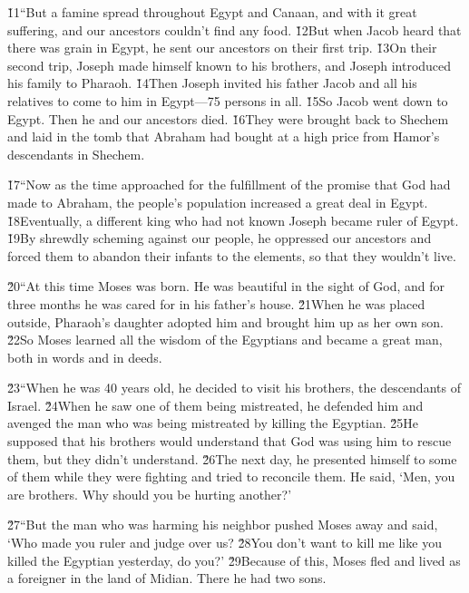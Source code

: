 \v{11}``But a famine spread throughout Egypt and Canaan, and with it great suffering, and our ancestors couldn't find any food. \v{12}But when Jacob heard that there was grain in Egypt, he sent our ancestors on their first trip. \v{13}On their second trip, Joseph made himself known to his brothers, and Joseph introduced his family to Pharaoh. \v{14}Then Joseph invited his father Jacob and all his relatives to come to him in Egypt---75 persons in all. \v{15}So Jacob went down to Egypt. Then he and our ancestors died. \v{16}They were brought back to Shechem and laid in the tomb that Abraham had bought at a high price from Hamor's descendants in Shechem.

\v{17}``Now as the time approached for the fulfillment of the promise that God had made to Abraham, the people's population increased a great deal in Egypt. \v{18}Eventually, a different king who had not known Joseph became ruler of Egypt. \v{19}By shrewdly scheming against our people, he oppressed our ancestors and forced them to abandon their infants to the elements, so that they wouldn't live.

\v{20}``At this time Moses was born. He was beautiful in the sight of God, and for three months he was cared for in his father's house. \v{21}When he was placed outside, Pharaoh's daughter adopted him and brought him up as her own son. \v{22}So Moses learned all the wisdom of the Egyptians and became a great man, both in words and in deeds.

\v{23}``When he was 40 years old, he decided to visit his brothers, the descendants of Israel. \v{24}When he saw one of them being mistreated, he defended him and avenged the man who was being mistreated by killing the Egyptian. \v{25}He supposed that his brothers would understand that God was using him to rescue them, but they didn't understand. \v{26}The next day, he presented himself to some of them while they were fighting and tried to reconcile them. He said, `Men, you are brothers. Why should you be hurting another?'

\v{27}``But the man who was harming his neighbor pushed Moses away and said, `Who made you ruler and judge over us? \v{28}You don't want to kill me like you killed the Egyptian yesterday, do you?' \v{29}Because of this, Moses fled and lived as a foreigner in the land of Midian. There he had two sons.

